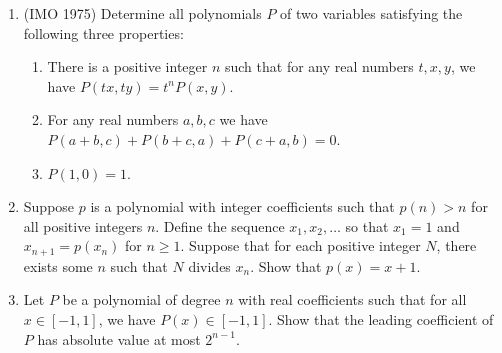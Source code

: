 \documentclass[11pt]{article}
\begin{document}
\begin{enumerate}
  \item (IMO 1975) Determine all polynomials $P$ of two variables satisfying the following three properties: 
  \begin{enumerate}
    \item There is a positive integer $n$ such that for any real numbers $t,x,y$, we have $P(tx,ty) = t^n P(x,y)$. 
    \item For any real numbers $a,b,c$ we have $P(a+b,c) + P(b+c,a) + P(c+a,b) = 0$. 
    \item $P(1,0) = 1$. 
  \end{enumerate}

  \item Suppose $p$ is a polynomial with integer coefficients such that $p(n) > n$ for all positive integers $n$. Define the sequence $x_1, x_2, \ldots$ so that $x_1 = 1$ and $x_{n+1} = p(x_n)$ for $n \geq 1$. Suppose that for each positive integer $N$, there exists some $n$ such that $N$ divides $x_n$. Show that $p(x) = x + 1$. 
    
  \item Let $P$ be a polynomial of degree $n$ with real coefficients such that for all $x \in [-1, 1]$, we have $P(x) \in [-1, 1]$. Show that the leading coefficient of $P$ has absolute value at most $2^{n-1}$. 

\end{enumerate} 
 
\end{document}
